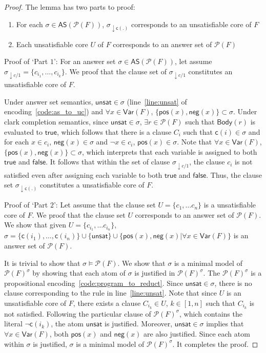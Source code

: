 \documentclass{article}
\newtheorem{proof}{Proof}
\newcommand{\unsat}{\ensuremath{\mathsf{unsat}}}
\newcommand{\pos}[1]{\ensuremath{\mathsf{pos}(#1)}}
\newcommand{\ngt}[1]{\ensuremath{\mathsf{neg}(#1)}}
\newcommand{\cls}[1]{\ensuremath{\mathsf{c}(#1)}}
\newcommand{\program}[1]{\mathcal{P}(#1)}
\newcommand{\body}[1]{\mathsf{Body}(#1)}
\newcommand{\true}{\ensuremath{\mathsf{true}}\xspace}
\newcommand{\false}{\ensuremath{\mathsf{false}}\xspace}
\newcommand{\Var}[1]{\mathsf{Var}(#1)}
\newcommand{\answer}[1]{\mathsf{AS}(#1)}
\begin{document}
\begin{proof}
  The lemma has two parts to proof:
  \begin{enumerate}
    \item For each $\sigma \in \answer{\program{F}}$, $\sigma_{\downarrow \cls{.}}$ corresponds to an unsatisfiable core of $F$
    \item Each unsatisfiable core $U$ of $F$ corresponds to an answer set of $\program{F}$ 
  \end{enumerate}
  Proof of `Part $1$': For an answer set $\sigma \in \answer{\program{F}}$, let assume $\sigma_{\downarrow c/1} = \{c_{i_1}, \ldots, c_{i_k}\}$.
  We proof that the clause set of $\sigma_{\downarrow c/1}$ constitutes an unsatisfiable core of $F$.

  Under answer set semantics, $\unsat \in \sigma$ (line~\ref{line:unsat} of encoding~\ref{code:as_to_uc}) and $\forall x \in \Var{F}$, $\{\pos{x}, \ngt{x}\} \subset \sigma$.
  Under clark completion semantics, since $\unsat \in \sigma$, $\exists r \in \program{F}$ such that 
  $\body{r}$ is evaluated to $\true$, which follows that there is a clause $C_i$ such that 
  $\cls{i} \in \sigma$ and for each $x \in c_i$, $\ngt{x} \in \sigma$ and $\neg{x} \in c_i$, $\pos{x} \in \sigma$.
  Note that $\forall x \in \Var{F}$, $\{\pos{x}, \ngt{x}\} \subset \sigma$, which interprets that each variable is assigned to both \true and \false.
  It follows that within the set of clause $\sigma_{\downarrow c/1}$, the clause $c_i$ is not satisfied even after assigning each variable to both \true and \false. 
  Thus, the clause set $\sigma_{\downarrow \cls{.}}$ constitutes a unsatisfiable core of $F$.

  Proof of `Part $2$': Let assume that the clause set $U = \{c_1, \ldots c_n\}$ is a unsatisfiable core of $F$.
  We proof that the clause set $U$ corresponds to an answer set of $\program{F}$. We show that given $U = \{c_{i_1}, \ldots c_{i_n}\}$, 
  $\sigma = \{\cls{i_1}, \ldots, \cls{i_n}\} \cup \{\unsat\} \cup \{\pos{x}, \ngt{x}| \forall x \in \Var{F}\}$ is an answer set of $\program{F}$.
  
  It is trivial to show that $\sigma \models \program{F}$. We show that  $\sigma$ is a minimal model of $\program{F}^{\sigma}$ by showing that each atom of $\sigma$ is justified in $\program{F}^{\sigma}$. 
  The $\program{F}^{\sigma}$ is a propositional encoding~\ref{code:program_to_reduct}.
  Since $\unsat \in \sigma$, there is no clause corresponding to the rule in line~\ref{line:unsat}. 
  Note that since $U$ is an unsatisfiable core of $F$, there exists a clause $C_{i_k} \in U$, $k \in [1,n]$ such that $C_{i_k}$ is not satisfied.
  Following the particular clause of $\program{F}^{\sigma}$, which contains the literal $\neg \cls{i_k}$, the atom $\unsat$ is justified. 
  Moreover, $\unsat \in \sigma$ implies that $\forall x \in \Var{F}$, both $\pos{x}$ and $\ngt{x}$ are also justified.
  Since each atom within $\sigma$ is justified, $\sigma$ is a minimal model of $\program{F}^{\sigma}$. It completes the proof. 
\end{proof}
\end{document}
